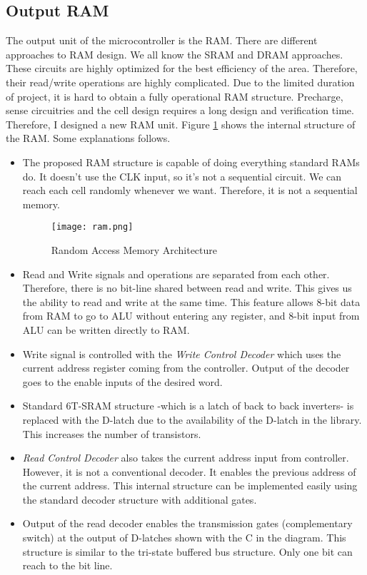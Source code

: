 \documentclass[12pt]{article}
\begin{document}
\subsection*{Output RAM}

The output unit of the microcontroller is the RAM. There are different approaches to RAM design. We all know the SRAM and DRAM approaches. These circuits are highly optimized for the best efficiency of the area. Therefore, their read/write operations are highly complicated. Due to the limited duration of project, it is hard to obtain a fully operational RAM structure. Precharge, sense circuitries and the cell design requires a long design and verification time. Therefore, I designed a new RAM unit. Figure \ref{ram} shows the internal structure of the RAM. Some explanations follows. 

\begin{itemize}
\item The proposed RAM structure is capable of doing everything standard RAMs do. It doesn't use the CLK input, so it's not a sequential circuit. We can reach each cell randomly whenever we want. Therefore, it is not a sequential memory.

\begin{figure}[H]
\centering
\texttt{[image: ram.png]}
\caption{Random Access Memory Architecture}
\label{ram}
\end{figure}



\item Read and Write signals and operations are separated from each other. Therefore, there is no bit-line shared between read and write. This gives us the ability to read and write at the same time. This feature allows 8-bit data from RAM to go to ALU without entering any register, and 8-bit input from ALU can be written directly to RAM.

\item Write signal is controlled with the \textsl{Write Control Decoder} which uses the current address register coming from the controller. Output of the decoder goes to the enable inputs of the desired word.

\item Standard 6T-SRAM structure -which is a latch of back to back inverters- is replaced with the D-latch due to the availability of the D-latch in the library. This increases the number of transistors.

\item \textsl{Read Control Decoder} also takes the current address input from controller. However, it is not a conventional decoder. It enables the previous address of the current address. This internal structure can be implemented easily using the standard decoder structure with additional gates. 

\item Output of the read decoder enables the transmission gates (complementary switch) at the output of D-latches shown with the C in the diagram. This structure is similar to the tri-state buffered bus structure. Only one bit can reach to the bit line.
\end{itemize}
\end{document}
